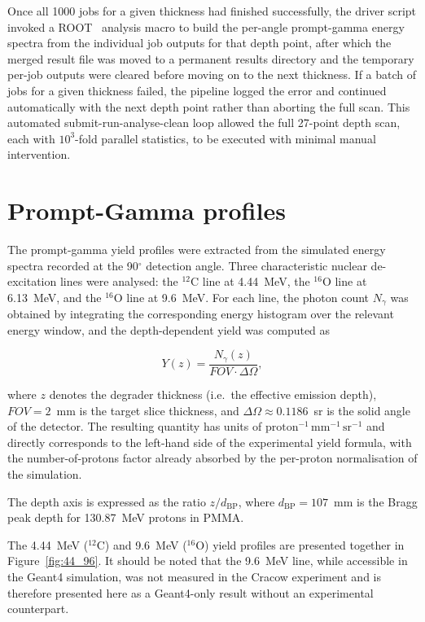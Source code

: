 \documentclass[a4paper]{article}
\begin{document}
Once all 1000 jobs for a given thickness had finished successfully, the driver script invoked a ROOT~\cite{root} analysis macro to build the per-angle prompt-gamma energy spectra from the individual job outputs for that depth point, after which the merged result file was moved to a permanent results directory and the temporary per-job outputs were cleared before moving on to the next thickness. If a batch of jobs for a given thickness failed, the pipeline logged the error and continued automatically with the next depth point rather than aborting the full scan. This automated submit-run-analyse-clean loop allowed the full 27-point depth scan, each with $10^3$-fold parallel statistics, to be executed with minimal manual intervention.

\section{Prompt-Gamma profiles}

The prompt-gamma yield profiles were extracted from the simulated energy spectra recorded at the 90$^\circ$ detection angle. Three characteristic nuclear de-excitation lines were analysed: the $^{12}$C line at 4.44~MeV, the $^{16}$O line at 6.13~MeV, and the $^{16}$O line at 9.6~MeV. For each line, the photon count $N_\gamma$ was obtained by integrating the corresponding energy histogram over the relevant energy window, and the depth-dependent yield was computed as

\begin{equation}
    Y(z) = \frac{N_\gamma(z)}{FOV \cdot \Delta\Omega},
    \label{eq:yield}
\end{equation}

where $z$ denotes the degrader thickness (i.e.\ the effective emission depth), $FOV = 2$~mm is the target slice thickness, and $\Delta\Omega \approx 0.1186$~sr is the solid angle of the detector. The resulting quantity has units of $\mathrm{proton^{-1}\,mm^{-1}\,sr^{-1}}$ and directly corresponds to the left-hand side of the experimental yield formula, with the number-of-protons factor already absorbed by the per-proton normalisation of the simulation.

The depth axis is expressed as the ratio $z/d_\mathrm{BP}$, where $d_\mathrm{BP} = 107$~mm is the Bragg peak depth for 130.87~MeV protons in PMMA.

The 4.44~MeV ($^{12}$C) and 9.6~MeV ($^{16}$O) yield profiles are presented together in Figure~\ref{fig:44_96}. It should be noted that the 9.6~MeV line, while accessible in the Geant4 simulation, was not measured in the Cracow experiment and is therefore presented here as a Geant4-only result without an experimental counterpart.
\end{document}
